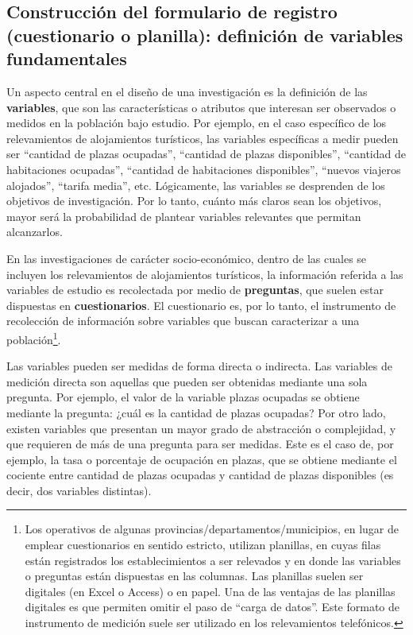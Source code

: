 \documentclass[
]{book}
\begin{document}
\hypertarget{construcciuxf3n-del-formulario-de-registro-cuestionario-o-planilla-definiciuxf3n-de-variables-fundamentales}{%
\subsection{Construcción del formulario de registro (cuestionario o planilla): definición de variables fundamentales}\label{construcciuxf3n-del-formulario-de-registro-cuestionario-o-planilla-definiciuxf3n-de-variables-fundamentales}}

Un aspecto central en el diseño de una investigación es la definición de las \textbf{variables}, que son las características o atributos que interesan ser observados o medidos en la población bajo estudio. Por ejemplo, en el caso específico de los relevamientos de alojamientos turísticos, las variables específicas a medir pueden ser ``cantidad de plazas ocupadas'', ``cantidad de plazas disponibles'', ``cantidad de habitaciones ocupadas'', ``cantidad de habitaciones disponibles'', ``nuevos viajeros alojados'', ``tarifa media'', etc. Lógicamente, las variables se desprenden de los objetivos de investigación. Por lo tanto, cuánto más claros sean los objetivos, mayor será la probabilidad de plantear variables relevantes que permitan alcanzarlos.

En las investigaciones de carácter socio-económico, dentro de las cuales se incluyen los relevamientos de alojamientos turísticos, la información referida a las variables de estudio es recolectada por medio de \textbf{preguntas}, que suelen estar dispuestas en \textbf{cuestionarios}. El cuestionario es, por lo tanto, el instrumento de recolección de información sobre variables que buscan caracterizar a una población\footnote{Los operativos de algunas provincias/departamentos/municipios, en lugar de emplear cuestionarios en sentido estricto, utilizan planillas, en cuyas filas están registrados los establecimientos a ser relevados y en donde las variables o preguntas están dispuestas en las columnas. Las planillas suelen ser digitales (en Excel o Access) o en papel. Una de las ventajas de las planillas digitales es que permiten omitir el paso de ``carga de datos''. Este formato de instrumento de medición suele ser utilizado en los relevamientos telefónicos.}.

Las variables pueden ser medidas de forma directa o indirecta. Las variables de medición directa son aquellas que pueden ser obtenidas mediante una sola pregunta. Por ejemplo, el valor de la variable plazas ocupadas se obtiene mediante la pregunta: ¿cuál es la cantidad de plazas ocupadas? Por otro lado, existen variables que presentan un mayor grado de abstracción o complejidad, y que requieren de más de una pregunta para ser medidas. Este es el caso de, por ejemplo, la tasa o porcentaje de ocupación en plazas, que se obtiene mediante el cociente entre cantidad de plazas ocupadas y cantidad de plazas disponibles (es decir, dos variables distintas).
\end{document}

